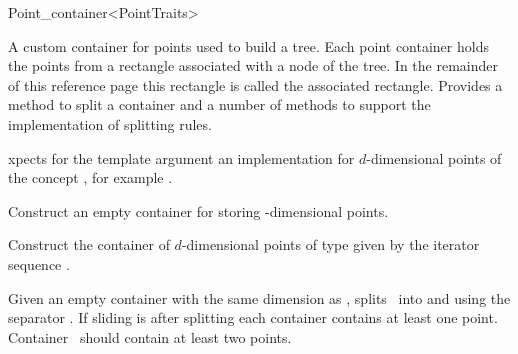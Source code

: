 

\begin{ccRefClass}{Point_container<PointTraits>}



\begin{ccAdvanced}


\ccDefinition
A custom container for points used to build a tree. Each point container
holds the points from a rectangle associated with a node of the tree.
In the remainder of this reference page this rectangle is called the
associated rectangle.
Provides a method to split a container and a number of methods
to support the implementation of splitting rules.


\ccParameters
xpects for the  template argument
an implementation for
$d$-dimensional points of
the concept , 
for example .

\ccTypes


\ccCreation
{}

{
Construct an empty container for storing -dimensional points.
}

{
Construct the container of $d$-dimensional points of type 
given by the iterator sequence \ccc{[begin, end)}.}



\ccOperations

{Given an empty container  with the same dimension as \ccVar, splits \ccVar\ into
\ccVar and  using the separator . If sliding is  after splitting 
each container contains at least one point. Container \ccVar\ should contain at least two points.}



\end{ccAdvanced}
\end{ccRefClass}
